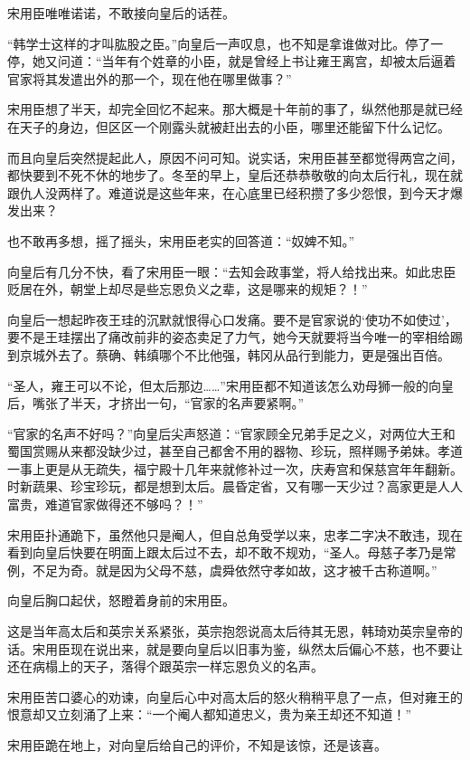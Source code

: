 宋用臣唯唯诺诺，不敢接向皇后的话茬。

“韩学士这样的才叫肱股之臣。”向皇后一声叹息，也不知是拿谁做对比。停了一停，她又问道：“当年有个姓章的小臣，就是曾经上书让雍王离宫，却被太后逼着官家将其发遣出外的那一个，现在他在哪里做事？”

宋用臣想了半天，却完全回忆不起来。那大概是十年前的事了，纵然他那是就已经在天子的身边，但区区一个刚露头就被赶出去的小臣，哪里还能留下什么记忆。

而且向皇后突然提起此人，原因不问可知。说实话，宋用臣甚至都觉得两宫之间，都快要到不死不休的地步了。冬至的早上，皇后还恭恭敬敬的向太后行礼，现在就跟仇人没两样了。难道说是这些年来，在心底里已经积攒了多少怨恨，到今天才爆发出来？

也不敢再多想，摇了摇头，宋用臣老实的回答道：“奴婢不知。”

向皇后有几分不快，看了宋用臣一眼：“去知会政事堂，将人给找出来。如此忠臣贬居在外，朝堂上却尽是些忘恩负义之辈，这是哪来的规矩？！”

向皇后一想起昨夜王珪的沉默就恨得心口发痛。要不是官家说的‘使功不如使过’，要不是王珪摆出了痛改前非的姿态卖足了力气，她今天就要将当今唯一的宰相给踢到京城外去了。蔡确、韩缜哪个不比他强，韩冈从品行到能力，更是强出百倍。

“圣人，雍王可以不论，但太后那边……”宋用臣都不知道该怎么劝母狮一般的向皇后，嘴张了半天，才挤出一句，“官家的名声要紧啊。”

“官家的名声不好吗？”向皇后尖声怒道：“官家顾全兄弟手足之义，对两位大王和蜀国赏赐从来都没缺少过，甚至自己都舍不用的器物、珍玩，照样赐予弟妹。孝道一事上更是从无疏失，福宁殿十几年来就修补过一次，庆寿宫和保慈宫年年翻新。时新蔬果、珍宝珍玩，都是想到太后。晨昏定省，又有哪一天少过？高家更是人人富贵，难道官家做得还不够吗？！”

宋用臣扑通跪下，虽然他只是阉人，但自总角受学以来，忠孝二字决不敢违，现在看到向皇后快要在明面上跟太后过不去，却不敢不规劝，“圣人。母慈子孝乃是常例，不足为奇。就是因为父母不慈，虞舜依然守孝如故，这才被千古称道啊。”

向皇后胸口起伏，怒瞪着身前的宋用臣。

这是当年高太后和英宗关系紧张，英宗抱怨说高太后待其无恩，韩琦劝英宗皇帝的话。宋用臣现在说出来，就是要向皇后以旧事为鉴，纵然太后偏心不慈，也不要让还在病榻上的天子，落得个跟英宗一样忘恩负义的名声。

宋用臣苦口婆心的劝谏，向皇后心中对高太后的怒火稍稍平息了一点，但对雍王的恨意却又立刻涌了上来：“一个阉人都知道忠义，贵为亲王却还不知道！”

宋用臣跪在地上，对向皇后给自己的评价，不知是该惊，还是该喜。

